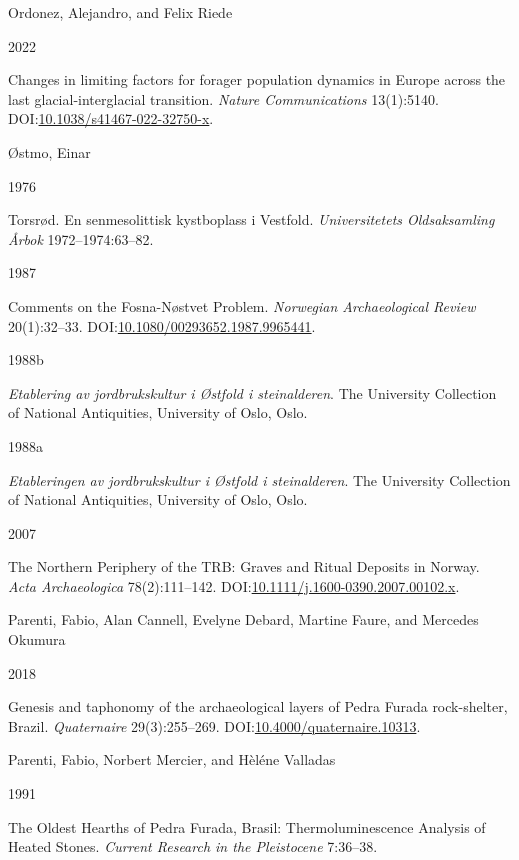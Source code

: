 \documentclass[
  12pt,
  a4paper,
  oneside]{book}
\newlength{\cslhangindent}
\newlength{\csllabelwidth}
\newlength{\cslentryspacingunit} %
\newenvironment{CSLReferences}[2] %
 {%
  \setlength{\parindent}{0pt}
  \ifodd #1
  \let\oldpar\par
  \def\par{\hangindent=\cslhangindent\oldpar}
  \fi
  \setlength{\parskip}{#2\cslentryspacingunit}
 }%
 {}
\newcommand{\CSLBlock}[1]{#1\hfill\break}
\newcommand{\CSLLeftMargin}[1]{\parbox[t]{\csllabelwidth}{#1}}
\newcommand{\CSLRightInline}[1]{\parbox[t]{\linewidth - \csllabelwidth}{#1}\break}
\begin{document}
\begin{CSLReferences}{0}{0}
\leavevmode{}%
\CSLBlock{Ordonez, Alejandro, and Felix Riede}
\CSLLeftMargin{ 2022}%
\CSLRightInline{{Changes in limiting factors for forager population dynamics in Europe across the last glacial-interglacial transition}. \emph{Nature Communications} 13(1):5140. DOI:\href{https://doi.org/10.1038/s41467-022-32750-x}{10.1038/s41467-022-32750-x}.}

\leavevmode{}%
\CSLBlock{Østmo, Einar}
\CSLLeftMargin{ 1976}%
\CSLRightInline{{Torsrød. En senmesolittisk kystboplass i Vestfold}. \emph{Universitetets Oldsaksamling Årbok} 1972--1974:63--82.}

\leavevmode{}%
\CSLLeftMargin{ 1987 }%
\CSLRightInline{{Comments on the Fosna-Nøstvet Problem}. \emph{Norwegian Archaeological Review} 20(1):32--33. DOI:\href{https://doi.org/10.1080/00293652.1987.9965441}{10.1080/00293652.1987.9965441}.}

\leavevmode{}%
\CSLLeftMargin{ 1988b }%
\CSLRightInline{\emph{{Etablering av jordbrukskultur i Østfold i steinalderen}}. The University Collection of National Antiquities, University of Oslo, Oslo.}

\leavevmode{}%
\CSLLeftMargin{ 1988a }%
\CSLRightInline{\emph{{Etableringen av jordbrukskultur i Østfold i steinalderen}}. The University Collection of National Antiquities, University of Oslo, Oslo.}

\leavevmode{}%
\CSLLeftMargin{ 2007 }%
\CSLRightInline{{The Northern Periphery of the TRB: Graves and Ritual Deposits in Norway}. \emph{Acta Archaeologica} 78(2):111--142. DOI:\href{https://doi.org/10.1111/j.1600-0390.2007.00102.x}{10.1111/j.1600-0390.2007.00102.x}.}

\leavevmode{}%
\CSLBlock{Parenti, Fabio, Alan Cannell, Evelyne Debard, Martine Faure, and Mercedes Okumura}
\CSLLeftMargin{ 2018}%
\CSLRightInline{Genesis and taphonomy of the archaeological layers of Pedra Furada rock-shelter, Brazil. \emph{Quaternaire} 29(3):255--269. DOI:\href{https://doi.org/10.4000/quaternaire.10313}{10.4000/quaternaire.10313}.}

\leavevmode{}%
\CSLBlock{Parenti, Fabio, Norbert Mercier, and Hèléne Valladas}
\CSLLeftMargin{ 1991}%
\CSLRightInline{The Oldest Hearths of Pedra Furada, Brasil: Thermoluminescence Analysis of Heated Stones. \emph{Current Research in the Pleistocene} 7:36--38.}


\end{CSLReferences}
\end{document}
